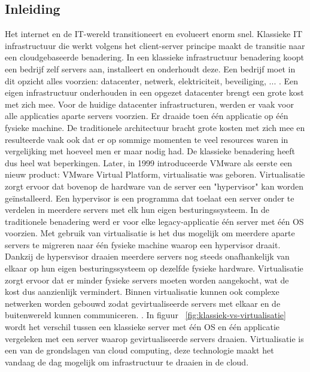 \subsection{Inleiding}
Het internet en de IT-wereld transitioneert en evolueert enorm snel. Klassieke IT infrastructuur die werkt volgens het client-server principe maakt de transitie naar een cloudgebaseerde benadering. In een klassieke infrastructuur benadering koopt een bedrijf zelf servers aan, installeert en onderhoudt deze. Een bedrijf moet in dit opzicht alles voorzien: datacenter, netwerk, elektriciteit, beveiliging, ... . Een eigen infrastructuur onderhouden in een opgezet datacenter brengt een grote kost met zich mee. Voor de huidige datacenter infrastructuren, werden er vaak voor alle applicaties aparte servers voorzien. Er draaide toen één applicatie op één fysieke machine. De traditionele architectuur bracht grote kosten met zich mee en resulteerde vaak ook dat er op sommige momenten te veel resources waren in vergelijking met hoeveel men er maar nodig had. De klassieke benadering heeft dus heel wat beperkingen. 
\newline
\newline
Later, in 1999 introduceerde VMware als eerste een nieuw product: VMware Virtual Platform, virtualisatie was geboren. Virtualisatie zorgt ervoor dat bovenop de hardware van de server een "hypervisor" kan worden geïnstalleerd. Een hypervisor is een programma dat toelaat een server onder te verdelen in meerdere servers met elk hun eigen besturingssysteem. In de traditionele benadering werd er voor elke legacy-applicatie één server met één OS voorzien. Met gebruik van virtualisatie is het dus mogelijk om meerdere aparte servers te migreren naar één fysieke machine waarop een hypervisor draait. Dankzij de hypersvisor draaien meerdere servers nog steeds onafhankelijk van elkaar op hun eigen besturingssysteem op dezelfde fysieke hardware. Virtualisatie zorgt ervoor dat er minder fysieke servers moeten worden aangekocht, wat de kost dus aanzienlijk vermindert. Binnen virtualisatie kunnen ook complexe netwerken worden gebouwd zodat gevirtualiseerde servers met elkaar en de buitenwereld kunnen communiceren. \autocite{RedHat2019}. In 
figuur ~\ref{fig:klassiek-vs-virtualisatie} wordt het verschil tussen een klassieke server met één OS en één applicatie vergeleken met een server waarop gevirtualiseerde servers draaien. Virtualisatie is een van de grondslagen van cloud computing, deze technologie maakt het vandaag de dag mogelijk om infrastructuur te draaien in de cloud.
\newline
